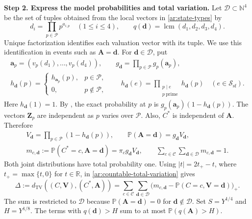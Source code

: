 \documentclass[twoside]{aomart}
\makeatletter
\theoremstyle{paperplain}
\theoremstyle{paperdefinition}
\renewenvironment{proof}[1][\proofname]{\par\pushQED{\qed}%
  \normalfont\topsep6\p@\@plus3\p@\relax\trivlist
  \item[\hskip\labelsep\itshape #1\@addpunct{.}]\ignorespaces
}{\popQED\endtrivlist\@endpefalse}
\newcommand{\N}{\mathbb N}
\newcommand{\Pp}{\mathbb P}
\newcommand{\TV}{d_{\mathrm{TV}}}
\numberwithin{equation}{section}
\makeatother
\begin{document}
\begin{proof}
\par
\medskip
\noindent\textbf{Step 2. Express the model probabilities and total variation.}
Let $\mathscr D\subset\N^4$ be the set of tuples obtained from
the local vectors in \eqref{ar:state-types} by
\begin{equation*}
 d_i=\prod_{p\in\mathcal P}p^{a_{i,p}}\quad(1\le i\le4),
 \qquad q(\mathbf d)=\operatorname{lcm}(d_1,d_2,d_3,d_4).
 \end{equation*}
Unique factorization identifies each valuation vector with its tuple.
We use this identification in events such as $\mathbf A=\mathbf d$.
For $\mathbf d\in\mathscr D$, put
\begin{equation*}
 \begin{gathered}
 \mathbf a_p=(v_p(d_1),\ldots,v_p(d_4)),\qquad
 g_{\mathbf d}=\prod_{p\in\mathcal P}g_p(\mathbf a_p),\\
 h_{\mathbf d}(p)=
 \begin{cases}h_{\mathbf a_p}(p),&p\in\mathcal P,\\0,&p\notin\mathcal P,
 \end{cases}
 \qquad
 h_{\mathbf d}(e)=\prod_{\substack{p\mid e\\p\ \mathrm{prime}}}h_{\mathbf d}(p)
 \quad(e\in\mathcal S_{\mathrm{sf}}).
 \end{gathered}
 \end{equation*}
Here $h_{\mathbf d}(1)=1$. By , the exact
probability at $p$ is $g_p(\mathbf a_p)(1-h_{\mathbf d}(p))$.
The vectors $\mathbf Z_p$ are independent as $p$ varies over $\mathcal P$.
Also, $C^*$ is independent of $\mathbf A$. Therefore
\begin{equation}
 \begin{gathered}
 V_{\mathbf d}=\prod_{p\in\mathcal P}(1-h_{\mathbf d}(p)),
 \qquad \Pp(\mathbf A=\mathbf d)=g_{\mathbf d}V_{\mathbf d},\\
 m_{c,\mathbf d}:=\Pp(C^*=c,\mathbf A=\mathbf d)
 =\pi_cg_{\mathbf d}V_{\mathbf d},\qquad
 \sum_{c\in\mathcal C}\sum_{\mathbf d\in\mathscr D}m_{c,\mathbf d}=1.
 \end{gathered}
 \label{ar:model-state-mass}
\end{equation}
Both joint distributions have total probability one.
Using $|t|=2t_+-t$, where $t_+=\max\{t,0\}$ for $t\in\mathbb R$,
in \eqref{ar:countable-total-variation} gives
\begin{equation*}
 \Delta:=\TV((C,\mathbf V),(C^*,\mathbf A))
 =\sum_{c\in\mathcal C}\sum_{\mathbf d\in\mathscr D}
       \bigl(m_{c,\mathbf d}-\Pp(C=c,\mathbf V=\mathbf d)\bigr)_+.
\end{equation*}
The sum is restricted to $\mathscr D$ because
$\Pp(\mathbf A=\mathbf d)=0$ for $\mathbf d\notin\mathscr D$.
Set $S=Y^{1/4}$ and $H=Y^{1/8}$.
The terms with $q(\mathbf d)>H$ sum to at most $\Pp(q(\mathbf A)>H)$.


\end{proof}
\end{document}
